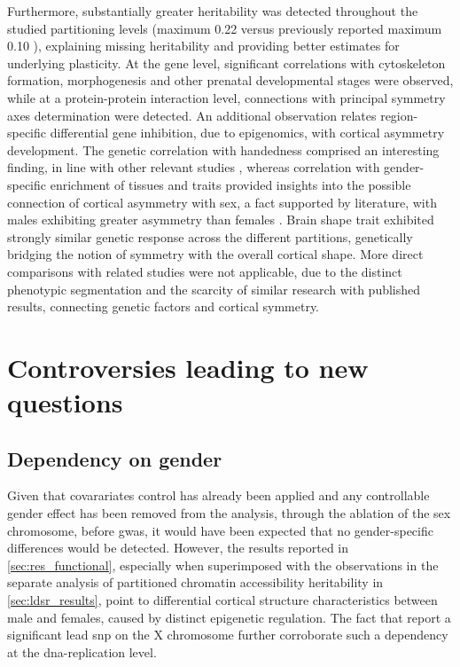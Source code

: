 Furthermore, substantially greater heritability was detected throughout the studied partitioning levels (maximum 0.22 versus previously reported maximum 0.10 \cite{Sha2021}), explaining missing heritability and providing better estimates for underlying plasticity. At the gene level, significant correlations with cytoskeleton formation, morphogenesis and other prenatal developmental stages were observed, while at a protein-protein interaction level, connections with principal symmetry axes determination were detected. An additional observation relates region-specific differential gene inhibition, due to epigenomics, with cortical asymmetry development. The genetic correlation with handedness comprised an interesting finding, in line with other relevant studies \cite{Kong2021}, whereas correlation with gender-specific enrichment of tissues and traits provided insights into the possible connection of cortical asymmetry with sex, a fact supported by literature, with males exhibiting greater asymmetry than females \cite{Guadalupe2015}. Brain shape trait exhibited strongly similar genetic response \cite{Naqvi2021} across the different partitions, genetically bridging the notion of symmetry with the overall cortical shape. More direct comparisons with related studies were not applicable,  due to the distinct phenotypic segmentation and the scarcity of similar research with published results, connecting genetic factors and cortical symmetry.

\section{Controversies leading to new questions}
\subsection{Dependency on gender}
Given that covarariates control has already been applied and any controllable gender effect has been removed from the analysis, through the ablation of the sex chromosome, before \ac{gwas}, it would have been expected that no gender-specific differences would be detected. However, the results reported in \autoref{sec:res_functional}, especially when superimposed with the observations in the separate analysis of partitioned chromatin accessibility heritability in \autoref{sec:ldsr_results}, point to differential cortical structure characteristics between male and females, caused by distinct epigenetic regulation. The fact that \cite{Sha2021} report a significant lead \ac{snp} on the X chromosome further corroborate such a dependency at the \ac{dna}-replication level.


